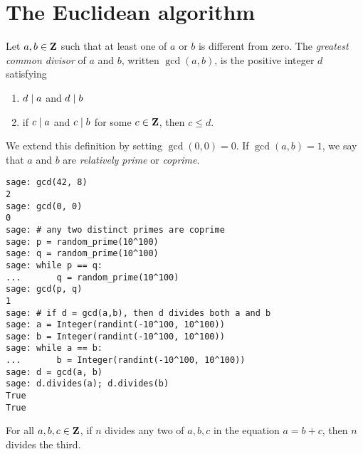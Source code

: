 
\section{The Euclidean algorithm}

Let $a,b \in \mathbf{Z}$ such that at least one of $a$ or $b$ is different
from zero. The
\emph{greatest common divisor} of $a$
and $b$, written $\gcd(a,b)$\index{$\gcd$}, is the positive integer
$d$ satisfying
%
\begin{enumerate}
\item $d \;|\; a$ and $d \;|\; b$

\item if $c \;|\; a$ and $c \;|\; b$ for some $c \in \mathbf{Z}$, then $c
  \leq d$.
\end{enumerate}
%
We extend this definition by setting $\gcd(0,0) = 0$. If
$\gcd(a,b) = 1$, we say that $a$ and $b$ are
\emph{relatively prime} or
\emph{coprime}.

\begin{lstlisting}
sage: gcd(42, 8)
2
sage: gcd(0, 0)
0
sage: # any two distinct primes are coprime
sage: p = random_prime(10^100)
sage: q = random_prime(10^100)
sage: while p == q:
...       q = random_prime(10^100)
sage: gcd(p, q)
1
sage: # if d = gcd(a,b), then d divides both a and b
sage: a = Integer(randint(-10^100, 10^100))
sage: b = Integer(randint(-10^100, 10^100))
sage: while a == b:
...       b = Integer(randint(-10^100, 10^100))
sage: d = gcd(a, b)
sage: d.divides(a); d.divides(b)
True
True
\end{lstlisting}

\begin{theorem}
\label{thm:unique_factorization:divides_any_two_terms_then_divides_third}
For all $a,b,c \in \mathbf{Z}$, if $n$ divides any two of $a,b,c$ in
the equation $a = b + c$, then $n$ divides the third.
\end{theorem}

